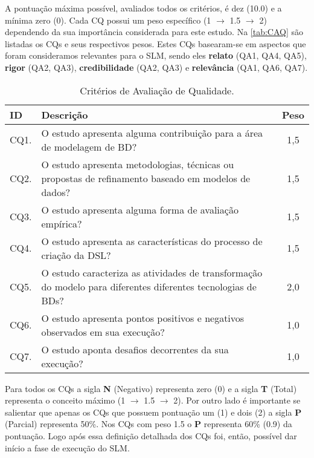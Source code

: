 A pontuação máxima possível, avaliados todos os critérios, é dez (10.0) e a mínima zero (0). 
Cada \ac{CQ} possui um peso específico (1 $\rightarrow$ 1.5 $\rightarrow$ 2) dependendo da sua importância considerada para este estudo. 
Na \autoref{tab:CAQ} são listadas os \acp{CQ} e seus respectivos pesos. 
Estes \acp{CQ} basearam-se em aspectos que foram consideramos relevantes para o \ac{SLM}, sendo eles \textbf{relato} (QA1, QA4, QA5), \textbf{rigor} (QA2, QA3), \textbf{credibilidade} (QA2, QA3) e \textbf{relevância} (QA1, QA6, QA7).
    
\begin{table}[!htb]
    \centering
    \small
    \caption{Critérios de Avaliação de Qualidade.}
    \label{tab:CAQ}
    \begin{tabular}{l|p{12cm}|c}
    \bottomrule
    \rowcolor[HTML]{C0C0C0}
    \textbf{ID} & \textbf{Descrição} & \textbf{Peso} 
    \\ 
    \hline
    CQ1. & O estudo apresenta alguma contribuição para a área de modelagem de \ac{BD}? & 1,5 
    \\
    CQ2. & O estudo apresenta metodologias, técnicas ou propostas de refinamento baseado em modelos de dados? & 1,5 
    \\
    CQ3. & O estudo apresenta alguma forma de avaliação empírica? & 1,5 
    \\
    CQ4. & O estudo apresenta as características do processo de criação da DSL? & 1,5 
    \\
    CQ5. & O estudo caracteriza as atividades de transformação do modelo para diferentes diferentes tecnologias de \acp{BD}? & 2,0 
    \\
    CQ6. & O estudo apresenta pontos positivos e negativos observados em sua execução? & 1,0 
    \\
    CQ7. & O estudo aponta desafios decorrentes da sua execução? & 1,0 
    \\
    \toprule
    \end{tabular}
\end{table}
    
Para todos os \acp{CQ} a sigla \textbf{N} (Negativo) representa zero (0) e a sigla \textbf{T} (Total) representa o conceito máximo (1 $\rightarrow$ 1.5 $\rightarrow$ 2). 
Por outro lado é importante se salientar que apenas os \acp{CQ} que possuem pontuação um (1) e  dois (2) a sigla \textbf{P} (Parcial) representa 50\%. 
Nos \acp{CQ} com peso 1.5 o \textbf{P} representa 60\% (0.9) da pontuação. 
Logo após essa definição detalhada dos \acp{CQ} foi, então, possível dar início a fase de execução do \ac{SLM}. 
    

